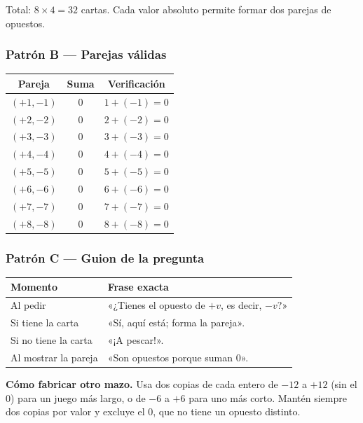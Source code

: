 \documentclass[12pt, letterpaper]{article}
\begin{document}
Total: $8\times 4=32$ cartas. Cada valor absoluto permite formar dos parejas de opuestos.

\subsubsection{Patrón B — Parejas válidas}

\begin{center}
\small
\begin{tabular}{@{}c c c@{}}
\toprule
\textbf{Pareja} & \textbf{Suma} & \textbf{Verificación}\\
\midrule
$(+1,-1)$ & $0$ & $1+(-1)=0$\\
$(+2,-2)$ & $0$ & $2+(-2)=0$\\
$(+3,-3)$ & $0$ & $3+(-3)=0$\\
$(+4,-4)$ & $0$ & $4+(-4)=0$\\
$(+5,-5)$ & $0$ & $5+(-5)=0$\\
$(+6,-6)$ & $0$ & $6+(-6)=0$\\
$(+7,-7)$ & $0$ & $7+(-7)=0$\\
$(+8,-8)$ & $0$ & $8+(-8)=0$\\
\bottomrule
\end{tabular}
\end{center}

\subsubsection{Patrón C — Guion de la pregunta}

\begin{center}
\small
\begin{tabular}{@{}p{6.2cm} p{8cm}@{}}
\toprule
\textbf{Momento} & \textbf{Frase exacta}\\
\midrule
Al pedir & «¿Tienes el opuesto de $+v$, es decir, $-v$?»\\
Si tiene la carta & «Sí, aquí está; forma la pareja».\\
Si no tiene la carta & «¡A pescar!».\\
Al mostrar la pareja & «Son opuestos porque suman $0$».\\
\bottomrule
\end{tabular}
\end{center}

\begin{cuadroadvertencia}
\textbf{Cómo fabricar otro mazo.} Usa dos copias de cada entero de $-12$ a $+12$ (sin el $0$) para un juego más largo, o de $-6$ a $+6$ para uno más corto. Mantén siempre dos copias por valor y excluye el $0$, que no tiene un opuesto distinto.
\end{cuadroadvertencia}
\end{document}
